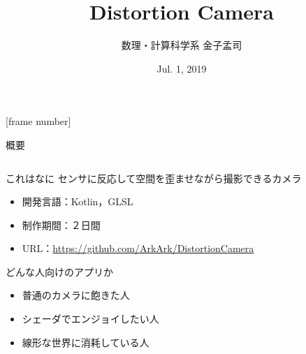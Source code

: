 \documentclass[dvipdfmx,12pt]{beamer}
\title{Distortion Camera}
\author{
  {\small 数理・計算科学系} 金子孟司
}
\institute{ソフトウェア開発演習 個人プロジェクト制作物デモ大会}
\date{Jul. 1, 2019}
\begin{document}
\frame[noframenumbering]{\maketitle}
[frame number]


\begin{frame}{概要}
  \begin{columns}[c]
    \begin{column}{0.6\linewidth}
      \begin{block}{これはなに}
        センサに反応して空間を歪ませながら撮影できるカメラ
      \end{block}
      \begin{itemize}
        \item 開発言語：Kotlin，GLSL
        \item 制作期間：２日間
        \item URL：\url{https://github.com/ArkArk/DistortionCamera}
      \end{itemize}
      \begin{exampleblock}{どんな人向けのアプリか}
        \begin{itemize}
          \item 普通のカメラに飽きた人
          \item シェーダでエンジョイしたい人
          \item 線形な世界に消耗している人
        \end{itemize}
      \end{exampleblock}
    \end{column}
    \begin{column}{0.4\linewidth}
      \begin{center}

\end{center}
\end{column}
\end{columns}
\end{frame}
\end{document}
